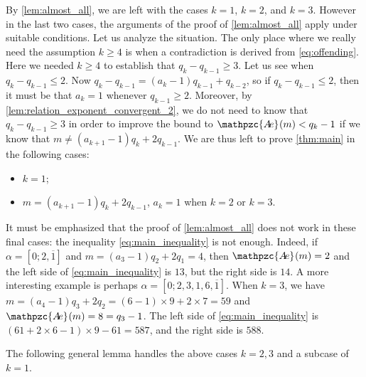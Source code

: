 \documentclass[a4paper,fleqn]{article}
\newcommand{\abexp}[2][]{\mathpzc{A\mkern-3mu e}_{#1}(#2)}
\begin{document}
  By \autoref{lem:almost_all}, we are left with the cases $k = 1$, $k = 2$, and $k = 3$. However in the last two cases,
  the arguments of the proof of \autoref{lem:almost_all} apply under suitable conditions. Let us analyze the situation.
  The only place where we really need the assumption $k \geq 4$ is when a contradiction is derived from
  \eqref{eq:offending}. Here we needed $k \geq 4$ to establish that $q_k - q_{k-1} \geq 3$. Let us see when
  $q_k - q_{k-1} \leq 2$. Now $q_k - q_{k-1} = (a_k - 1)q_{k-1} + q_{k-2}$, so if $q_k - q_{k-1} \leq 2$, then it must
  be that $a_k = 1$ whenever $q_{k-1} \geq 2$. Moreover, by \autoref{lem:relation_exponent_convergent_2}, we do not
  need to know that $q_k - q_{k-1} \geq 3$ in order to improve the bound to $\abexp{m} < q_k - 1$ if we know that
  $m \neq (a_{k+1} - 1)q_k + 2q_{k-1}$. We are thus left to prove \autoref{thm:main} in the following cases:
  \begin{itemize}
    \item $k = 1$;
    \item $m = (a_{k+1} - 1)q_k + 2q_{k-1}$, $a_k = 1$ when $k = 2$ or $k = 3$.
  \end{itemize}

  It must be emphasized that the proof of \autoref{lem:almost_all} does not work in these final cases: the inequality
  \eqref{eq:main_inequality} is not enough. Indeed, if $\alpha = [0; 2, \overline{1}]$ and
  $m = (a_3 - 1)q_2 + 2q_1 = 4$, then $\abexp{m} = 2$ and the left side of \eqref{eq:main_inequality} is $13$, but the
  right side is $14$. A more interesting example is perhaps $\alpha = [0; 2, 3, 1, 6, \overline{1}]$. When $k = 3$, we
  have $m = (a_4 - 1)q_3 + 2q_2 = (6 - 1) \times 9 + 2 \times 7 = 59$ and $\abexp{m} = 8 = q_3 - 1$. The left side of
  \eqref{eq:main_inequality} is $(61 + 2 \times 6 - 1) \times 9 - 61 = 587$, and the right side is $588$.

  The following general lemma handles the above cases $k = 2, 3$ and a subcase of $k = 1$.
\end{document}
